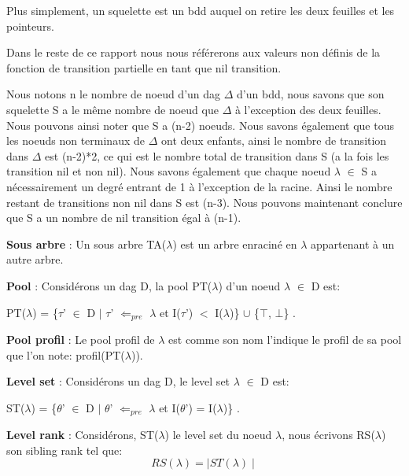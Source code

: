 \documentclass[french]{article}
\begin{document}
Plus simplement, un squelette est un bdd auquel on retire les deux feuilles et les pointeurs.

Dans le reste de ce rapport nous nous référerons aux valeurs non définis de la fonction de transition partielle en tant que nil transition.
\vspace{5mm} 

Nous notons n le nombre de noeud d'un dag \(\Delta\) d'un bdd, nous savons que son squelette S a le même nombre de noeud que \(\Delta\) à l'exception des deux feuilles. Nous pouvons ainsi noter que S a (n-2) noeuds. Nous savons également que tous les noeuds non terminaux de \(\Delta\) ont deux enfants, ainsi le nombre de transition dans \(\Delta\) est (n-2)*2, ce qui est le nombre total de transition dans S (a la fois les transition nil et non nil). Nous savons également que chaque noeud \(\lambda\) \(\in\) S a nécessairement un degré entrant de 1 à l'exception de la racine. Ainsi le nombre restant de transitions non nil dans S est (n-3). Nous pouvons maintenant conclure que S a un nombre de nil transition égal à (n-1).
\vspace{5mm} 

\textbf{Sous arbre} : Un sous arbre TA(\(\lambda\)) est un arbre enraciné en \(\lambda\) appartenant à un autre arbre.

\textbf{Pool} : Considérons un dag D, la pool PT(\(\lambda\)) d'un noeud \(\lambda\) \(\in\) D est:

\begin{center}
PT(\(\lambda\)) = \{\(\tau\)’ \(\in\) D \(\mid\)  \(\tau\)’ \(\Leftarrow_{pre}\) \(\lambda\) et I(\(\tau\)’) \(<\) I(\(\lambda\))\} \(\cup\) \{\(\top\), \(\bot\)\} .
\end{center}

\textbf{Pool profil} : Le pool profil de \(\lambda\) est comme son nom l'indique le profil de sa pool que l'on note: profil(PT(\(\lambda\))). 

\textbf{Level set} : Considérons un dag D, le level set \(\lambda\) \(\in\) D est:
\begin{center}
ST(\(\lambda\)) = \{\(\theta\)’ \(\in\) D \(\mid\) \(\theta\)’ \(\Leftarrow_{pre}\) \(\lambda\) et I(\(\theta\)’) = I(\(\lambda\))\} . 
\end{center}
\textbf{Level rank} : Considérons, ST(\(\lambda\)) le level set du noeud \(\lambda\), nous écrivons RS(\(\lambda\)) son sibling rank tel que:
\[ RS(\lambda) = \mid ST(\lambda)\mid \]
\end{document}
